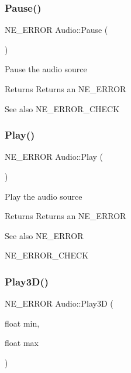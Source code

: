 \subsubsection{\texorpdfstring{Pause()}{Pause()}}
{\footnotesize\ttfamily N\+E\+\_\+\+E\+R\+R\+OR Audio\+::\+Pause (\begin{DoxyParamCaption}{ }\end{DoxyParamCaption})}

Pause the audio source \begin{DoxyReturn}{Returns}
Returns an N\+E\+\_\+\+E\+R\+R\+OR 
\end{DoxyReturn}
\begin{DoxySeeAlso}{See also}
N\+E\+\_\+\+E\+R\+R\+O\+R\+\_\+\+C\+H\+E\+CK 
\end{DoxySeeAlso}
\mbox{\label{class_audio_a2528c364d97e19cd005b0461ec8cbfb1}} 
\subsubsection{\texorpdfstring{Play()}{Play()}}
{\footnotesize\ttfamily N\+E\+\_\+\+E\+R\+R\+OR Audio\+::\+Play (\begin{DoxyParamCaption}{ }\end{DoxyParamCaption})}

Play the audio source \begin{DoxyReturn}{Returns}
Returns an N\+E\+\_\+\+E\+R\+R\+OR 
\end{DoxyReturn}
\begin{DoxySeeAlso}{See also}
N\+E\+\_\+\+E\+R\+R\+OR 

N\+E\+\_\+\+E\+R\+R\+O\+R\+\_\+\+C\+H\+E\+CK 
\end{DoxySeeAlso}
\mbox{\label{class_audio_a8ce5260db0daaef85f4509fdad58cbab}} 
\subsubsection{\texorpdfstring{Play3D()}{Play3D()}}
{\footnotesize\ttfamily N\+E\+\_\+\+E\+R\+R\+OR Audio\+::\+Play3D (\begin{DoxyParamCaption}\item[{float}]{min,  }\item[{float}]{max }\end{DoxyParamCaption})}

